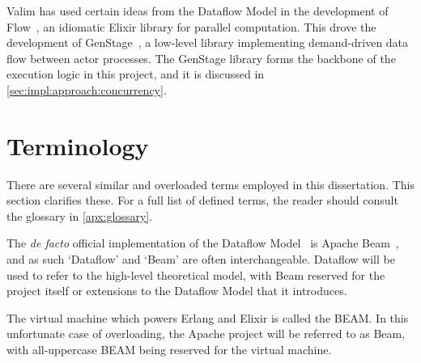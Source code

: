 Valim has used certain ideas from the Dataflow Model in the development of Flow~\cite{ElixirFlow}, an idiomatic Elixir library for parallel computation.
This drove the development of GenStage~\cite{ElixirGenStage}, a low-level library implementing demand-driven data flow between actor processes.
The GenStage library forms the backbone of the execution logic in this project, and it is discussed in \cref{sec:impl:approach:concurrency}.

\section{Terminology}\label{sec:intro:terminology}

There are several similar and overloaded terms employed in this dissertation.
This section clarifies these.
For a full list of defined terms, the reader should consult the glossary in \cref{apx:glossary}.

The \emph{de facto} official implementation of the Dataflow Model~\cite{Akidau:2015} is Apache Beam~\cite{ApacheBeam}, and as such `Dataflow' and `Beam' are often interchangeable.
Dataflow will be used to refer to the high-level theoretical model, with Beam reserved for the project itself or extensions to the Dataflow Model that it introduces.

The virtual machine which powers Erlang and Elixir is called the BEAM.
In this unfortunate case of overloading, the Apache project will be referred to as Beam, with all-uppercase BEAM being reserved for the virtual machine.
